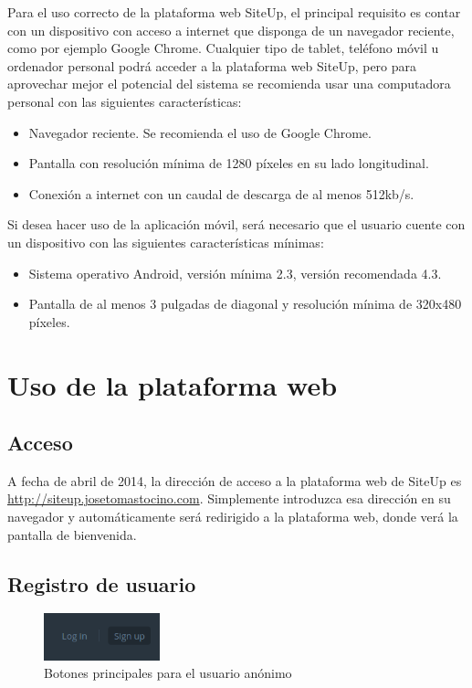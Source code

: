 Para el uso correcto de la plataforma web SiteUp, el principal requisito es
contar con un dispositivo con acceso a internet que disponga de un navegador
reciente, como por ejemplo Google Chrome. Cualquier tipo de tablet, teléfono
móvil u ordenador personal podrá acceder a la plataforma web SiteUp, pero para
aprovechar mejor el potencial del sistema se recomienda usar una computadora
personal con las siguientes características:

\begin{itemize}
\item Navegador reciente. Se recomienda el uso de Google Chrome.
\item Pantalla con resolución mínima de 1280 píxeles en su lado longitudinal.
\item Conexión a internet con un caudal de descarga de al menos 512kb/s.
\end{itemize}

Si desea hacer uso de la aplicación móvil, será necesario que el usuario cuente
con un dispositivo con las siguientes características mínimas:

\begin{itemize}
\item Sistema operativo Android, versión mínima 2.3, versión recomendada 4.3.
\item Pantalla de al menos 3 pulgadas de diagonal y resolución mínima de 320x480
  píxeles.
\end{itemize}

\section{Uso de la plataforma web}

\subsection{Acceso}

A fecha de abril de 2014, la dirección de acceso a la plataforma web de SiteUp
es \url{http://siteup.josetomastocino.com}. Simplemente introduzca esa dirección
en su navegador y automáticamente será redirigido a la plataforma web, donde
verá la pantalla de bienvenida.

\subsection{Registro de usuario}

\begin{figure}[hbtp]
  \centering
  \includegraphics[width=0.3\textwidth]{apendice_manual_usuario/general_botones.png}
  \caption{Botones principales para el usuario anónimo}
  \label{fig:botones-1}
\end{figure}

